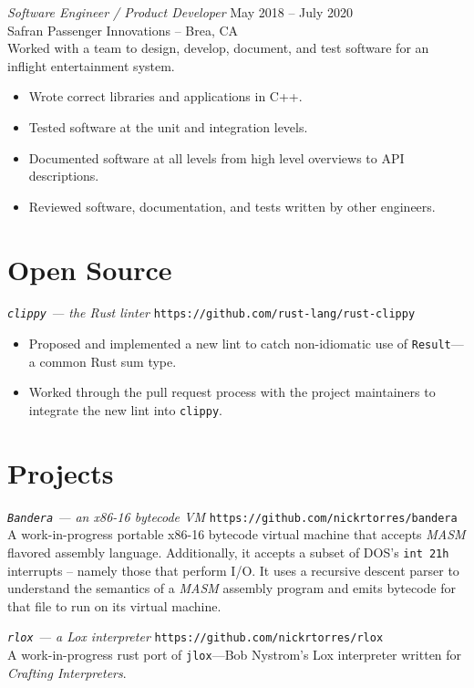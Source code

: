 \documentclass[margin]{res}
\begin{document}
\begin{resume}
                {\sl Software Engineer / Product Developer} \hfill May 2018 -- July 2020 \\
                Safran Passenger Innovations -- Brea, CA\\
                Worked with a team to design, develop, document, and test
                software for an inflight entertainment system.
                 \begin{itemize}
                    \item Wrote correct libraries and applications in C++.
                    \item Tested software at the unit and integration levels.
                    \item Documented software at all levels from high level
                    overviews to API descriptions.
                    \item Reviewed software, documentation, and tests written
                    by other engineers.
                \end{itemize}
\section{Open Source}
              {\sl \texttt{clippy} --- the Rust linter} \hfill \texttt{https://github.com/rust-lang/rust-clippy}
                 \begin{itemize}
                   \item Proposed and implemented a new lint to catch non-idiomatic use of
                   \texttt{Result}---a common Rust sum type.
                   \item Worked through the pull request process with the
                   project maintainers to integrate the new lint into
                   \texttt{clippy}.
                 \end{itemize}
\section{Projects}
             {\sl \texttt{Bandera} --- an x86-16 bytecode VM} \hfill \texttt{https://github.com/nickrtorres/bandera}
             A work-in-progress portable x86-16 bytecode virtual machine that
             accepts \textit{MASM} flavored assembly language. Additionally, it accepts
             a subset of DOS's \texttt{int 21h} interrupts -- namely those that
             perform I/O. It uses a recursive descent parser to understand the
             semantics of a \textit{MASM} assembly program and emits bytecode for that
             file to run on its virtual machine.

             {\sl \texttt{rlox} --- a Lox interpreter} \hfill \texttt{https://github.com/nickrtorres/rlox} \\
             A work-in-progress rust port of \texttt{jlox}---Bob Nystrom's Lox interpreter
             written for {\sl Crafting Interpreters}.

\end{resume}
\end{document}
